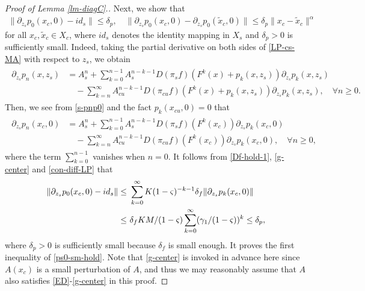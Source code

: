 \documentclass[reqno]{amsart}
\numberwithin{equation}{section}
\begin{document}
\begin{proof}[Proof of Lemma {\rm \ref{lm-diagC}}.]
Next, we show that 
\begin{align}\label{ps0-sm-hold}
\| \partial_{z_s} p_0(x_c,0)-id_s\| \le \delta_p,   \quad 
\| \partial_{z_s} p_0(x_c,0) - \partial_{z_s} p_0(\tilde x_c,0) \| \le    \delta_p \|x_c-\tilde x_c\|^\alpha
\end{align}
for all $x_c,\tilde x_c\in X_c$, where $id_s$ denotes the identity mapping in $X_s$ and $\delta_p>0$ is sufficiently small.  
Indeed, taking the partial derivative on both sides of \eqref{LP-cs-MA}  with respect to $z_s$, we obtain
\begin{align}\label{s-pnp0}
\begin{split}
\partial_{z_s}p_n(x,z_s)
&= A_s^n + \sum_{k=0}^{n-1} A_s^{n-k-1} D(\pi_s f)(F^k(x)+p_k(x,z_s)) \partial_{z_s} p_k(x,z_s)
\\
&\quad - \sum_{k=n}^\infty A_{cu}^{n-k-1} D(\pi_{cu} f)(F^k(x)+p_k(x,z_s)) \partial_{z_s} p_k(x,z_s), \quad \forall n\ge 0.
\end{split}    
\end{align}
Then, we see from \eqref{s-pnp0} and the fact $p_k(x_{cu},0)=0$  that 
\begin{align}\label{p0-00}
\begin{split}
\partial_{z_s}p_n(x_c,0) &= A_s^n + \sum_{k=0}^{n-1} A_s^{n-k-1} D(\pi_s f)(F^k(x_{c}) ) \partial_{z_s} p_k(x_{c},0)
\\
&\quad - \sum_{k=n}^\infty A_{cu}^{n-k-1} D(\pi_{cu} f)(F^k(x_{c}) ) \partial_{z_s} p_k(x_{c},0), \quad \forall n\ge 0,
\end{split}
\end{align}
where the term $\sum_{k=0}^{n-1}$ vanishes when $n=0$. 
It follows from \eqref{Df-hold-1}, \eqref{g-center} and \eqref{con-diff-LP} that 
\begin{align*} 
 \|\partial_{z_s} p_0(x_{c},0)-id_s\| \le &~  \sum_{k=0}^\infty K (1-\varsigma)^{-k-1} \delta_f   \| \partial_{z_s} p_k(x_{c},0)\| 
\notag \\
\le&~   \delta_f KM/(1-\varsigma)  \sum_{k=0}^\infty  (\gamma_1/(1-\varsigma))^k \le \delta_p,   
\end{align*}
where $\delta_p>0$ is sufficiently small because $\delta_f$ is small enough. 
It proves the first inequality of \eqref{ps0-sm-hold}. Note that \eqref{g-center} is invoked in advance here since $A(x_c)$ is a small perturbation of $A$, and thus we may reasonably assume that $A$ also satisfies \eqref{ED}-\eqref{g-center} in this proof.
 

\end{proof}
\end{document}
